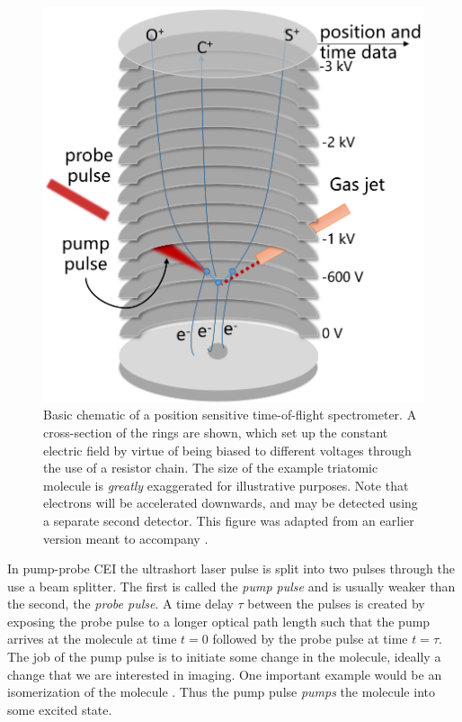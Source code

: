 \begin{figure}
  \centering
  \includegraphics[width=\textwidth]{gfx/SpectrometerLaser}
  \caption[Basic chematic of a position Ssnsitive time-of-flight spectrometer.]
  {Basic chematic of a position sensitive time-of-flight spectrometer. A cross-section of the rings are shown, which set up the constant electric field by virtue of being biased to different voltages through the use of a resistor chain. The size of the example triatomic molecule is \emph{greatly} exaggerated for illustrative purposes. Note that electrons will be accelerated downwards, and may be detected using a separate second detector. This figure was adapted from an earlier version meant to accompany \citet{Ramadhan16}.}
  \label{fig:spectrometer}
\end{figure}

In pump-probe CEI the ultrashort laser pulse is split into two pulses through the use a beam splitter. The first is called the \emph{pump pulse} and is usually weaker than the second, the \emph{probe pulse}. A time delay $\tau$ between the pulses is created by exposing the probe pulse to a longer optical path length such that the pump arrives at the molecule at time $t=0$ followed by the probe pulse at time $t=\tau$. The job of the pump pulse is to initiate some change in the molecule, ideally a change that we are interested in imaging. One important example would be an isomerization of the molecule \citep{Ibrahim14,Liekhus-Schmaltz15}. Thus the pump pulse \emph{pumps} the molecule into some excited state.

